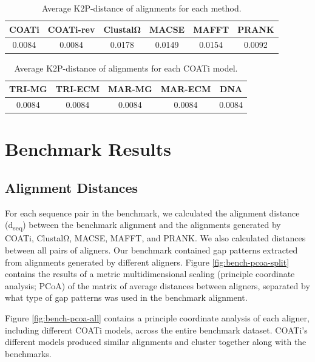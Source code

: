 \documentclass[
]{article}
\begin{document}
\begin{table}[H]
\centering
\caption{\label{tab:k2p-table-1}Average K2P-distance of alignments for each method.}
\centering
\begin{tabular}[t]{cccccc}
\toprule
COATi & COATi-rev & ClustalΩ & MACSE & MAFFT & PRANK\\
\midrule
0.0084 & 0.0084 & 0.0178 & 0.0149 & 0.0154 & 0.0092\\
\bottomrule
\end{tabular}
\end{table}

\begin{table}[H]
\centering
\caption{\label{tab:k2p-table-2}Average K2P-distance of alignments for each COATi model.}
\centering
\begin{tabular}[t]{ccccc}
\toprule
TRI-MG & TRI-ECM & MAR-MG & MAR-ECM & DNA\\
\midrule
0.0084 & 0.0084 & 0.0084 & 0.0084 & 0.0084\\
\bottomrule
\end{tabular}
\end{table}

\section{Benchmark Results}\label{benchmark-results}

\subsection{Alignment Distances}\label{alignment-distances}

For each sequence pair in the benchmark, we calculated the alignment distance
(d\textsubscript{seq}) between the benchmark alignment and the alignments generated by COATi,
ClustalΩ, MACSE, MAFFT, and PRANK. We also calculated distances between all
pairs of aligners. Our benchmark contained gap patterns extracted from
alignments generated by different aligners. Figure
\ref{fig:bench-pcoa-split} contains the results of a metric multidimensional
scaling (principle coordinate analysis; PCoA) of the matrix of average
distances between aligners, separated by what type of gap patterns was used in
the benchmark alignment.

Figure \ref{fig:bench-pcoa-all} contains a principle coordinate analysis of
each aligner, including different COATi models, across the entire benchmark
dataset. COATi's different models produced similar alignments and cluster
together along with the benchmarks.
\end{document}

